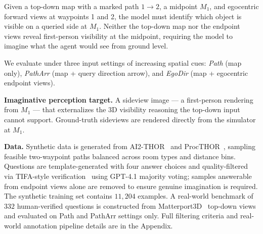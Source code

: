 \documentclass{llmxive}
\begin{document}


Given a top-down map with a marked path $1\!\rightarrow\!2$, a midpoint $M_1$, and egocentric forward views at waypoints 1 and 2, the model must identify which object is visible on a queried side at $M_1$. Neither the top-down map nor the endpoint views reveal first-person visibility at the midpoint, requiring the model to imagine what the agent would see from ground level.

We evaluate under three input settings of increasing spatial cues: \emph{Path} (map only), \emph{PathArr} (map + query direction arrow), and \emph{EgoDir} (map + egocentric endpoint views).

\noindent\textbf{Imaginative perception target.} A sideview image — a first-person rendering from $M_1$ — that externalizes the 3D visibility reasoning the top-down input cannot support. Ground-truth sideviews are rendered directly from the simulator at $M_1$.

\noindent\textbf{Data.}
Synthetic data is generated from AI2-THOR~\cite{kolve2017ai2} and ProcTHOR~\cite{deitke2022procthor}, sampling feasible two-waypoint paths balanced across room types and distance bins.
Questions are template-generated with four answer choices and quality-filtered via TIFA-style verification~\cite{hu2023tifa} using GPT-4.1 majority voting; samples answerable from endpoint views alone are removed to ensure genuine imagination is required.
The synthetic training set contains $11{,}204$ examples.
A real-world benchmark of $332$ human-verified questions is constructed from Matterport3D~\cite{chang2017matterport3d} top-down views and evaluated on Path and PathArr settings only.
Full filtering criteria and real-world annotation pipeline details are in the Appendix.
\end{document}
